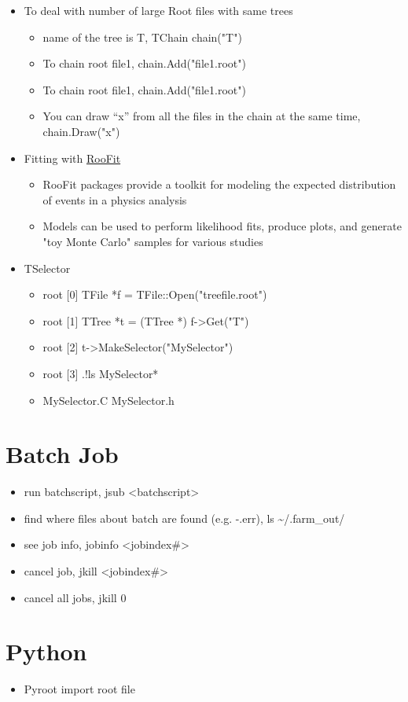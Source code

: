 \documentclass[11pt]{article}
\begin{document}
\begin{itemize}
\item To deal with number of large Root files with same trees
\begin{itemize}
\item name of the tree is T, TChain chain("T")
\item To chain root file1, chain.Add("file1.root")
\item To chain root file1, chain.Add("file1.root")
\item You can draw “x” from all the files in the chain at the same time, chain.Draw("x")
\end{itemize}
\item Fitting with \href{http://roofit.sourceforge.net/}{RooFit}
\begin{itemize}
\item RooFit packages provide a toolkit for modeling the expected distribution of events in a physics analysis
\item Models can be used to perform likelihood fits, produce plots, and generate "toy Monte Carlo" samples for various studies
\end{itemize}
\item TSelector
\begin{itemize}
\item root [0] TFile *f = TFile::Open("treefile.root")
\item root [1] TTree *t = (TTree *) f->Get("T")
\item root [2] t->MakeSelector("MySelector")
\item root [3] .!ls MySelector*
\item MySelector.C  MySelector.h
\end{itemize}
\end{itemize}
\section{Batch Job}
\label{sec:orgba290b4}
\begin{itemize}
\item run batchscript, jsub <batchscript>
\item find where files about batch are found (e.g. -.err), ls \textasciitilde{}/.farm\_out/
\item see job info, jobinfo <jobindex\#>
\item cancel job, jkill <jobindex\#>
\item cancel all jobs, jkill 0
\end{itemize}
\section{Python}
\label{sec:org0edb3a8}
\begin{itemize}
\item Pyroot import root file
\end{itemize}
\end{document}
